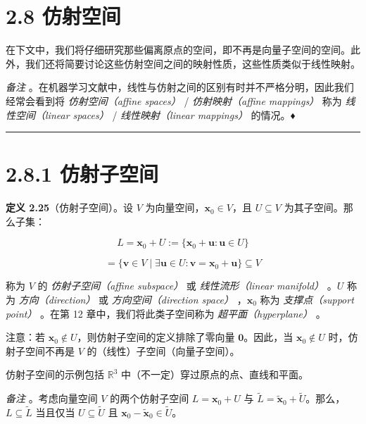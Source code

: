 \section*{2.8 仿射空间}
\label{sec:2.8}

在下文中，我们将仔细研究那些偏离原点的空间，即不再是向量子空间的空间。此外，我们还将简要讨论这些仿射空间之间的映射性质，这些性质类似于线性映射。

\emph{备注} 。在机器学习文献中，线性与仿射之间的区别有时并不严格分明，因此我们经常会看到将 \emph{仿射空间（affine spaces）} / \emph{仿射映射（affine mappings）} 称为 \emph{线性空间（linear spaces）} / \emph{线性映射（linear mappings）} 的情况。♦

\medskip\hrule\medskip

\section*{2.8.1 仿射子空间}

\textbf{定义 2.25}（仿射子空间）。设 $ V $ 为向量空间，$ \boldsymbol{x}_0 \in V $，且 $ U \subseteq V $ 为其子空间。那么子集：

\begin{equation}
L = \boldsymbol{x}_0 + U := \{\boldsymbol{x}_0 + \boldsymbol{u} : \boldsymbol{u} \in U\}
\tag{2.130a}\label{eq:2-130a}
\end{equation}

\begin{equation}
= \{\boldsymbol{v} \in V \mid \exists \boldsymbol{u} \in U : \boldsymbol{v} = \boldsymbol{x}_0 + \boldsymbol{u}\} \subseteq V
\tag{2.130b}\label{eq:2-130b}
\end{equation}

称为 $ V $ 的 \emph{仿射子空间（affine subspace）} 或 \emph{线性流形（linear manifold）} 。$ U $ 称为 \emph{方向（direction）} 或 \emph{方向空间（direction space）} ，$ \boldsymbol{x}_0 $ 称为 \emph{支撑点（support point）} 。在第 12 章中，我们将此类子空间称为 \emph{超平面（hyperplane）} 。

注意：若 $ \boldsymbol{x}_0 \notin U $，则仿射子空间的定义排除了零向量 $ \boldsymbol{0} $。因此，当 $ \boldsymbol{x}_0 \notin U $ 时，仿射子空间不再是 $ V $ 的（线性）子空间（向量子空间）。

仿射子空间的示例包括 $ \mathbb{R}^3 $ 中（不一定）穿过原点的点、直线和平面。

\emph{备注} 。考虑向量空间 $ V $ 的两个仿射子空间 $ L = \boldsymbol{x}_0 + U $ 与 $ \tilde{L} = \tilde{\boldsymbol{x}}_0 + \tilde{U} $。那么，$ L \subseteq \tilde{L} $ 当且仅当 $ U \subseteq \tilde{U} $ 且 $ \boldsymbol{x}_0 - \tilde{\boldsymbol{x}}_0 \in \tilde{U} $。

